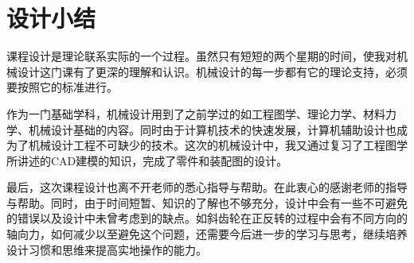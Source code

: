 \section{设计小结}
课程设计是理论联系实际的一个过程。虽然只有短短的两个星期的时间，使我对机械设计这门课有了更深的理解和认识。机械设计的每一步都有它的理论支持，必须要按照它的标准进行。

作为一门基础学科，机械设计用到了之前学过的如工程图学、理论力学、材料力学、机械设计基础的内容。同时由于计算机技术的快速发展，计算机辅助设计也成为了机械设计工程不可缺少的技术。这次的机械设计中，我又通过复习了工程图学所讲述的CAD建模的知识，完成了零件和装配图的设计\cite{刘苏}。

最后，这次课程设计也离不开老师的悉心指导与帮助。在此衷心的感谢老师的指导与帮助。同时，由于时间短暂、知识的了解也不够充分，设计中会有一些不可避免的错误以及设计中未曾考虑到的缺点。如斜齿轮在正反转的过程中会有不同方向的轴向力，如何减少以至避免这个问题，还需要今后进一步的学习与思考，继续培养设计习惯和思维来提高实地操作的能力。